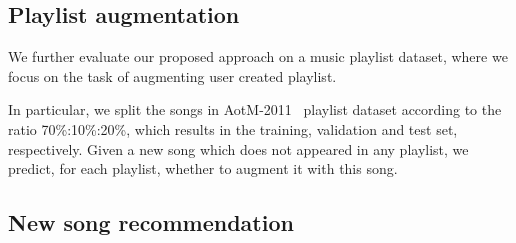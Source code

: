 \subsection{Playlist augmentation}

We further evaluate our proposed approach on a music playlist dataset, 
where we focus on the task of augmenting user created playlist.

In particular, we split the songs in AotM-2011~\cite{mcfee2012hypergraph} playlist dataset
according to the ratio 70\%:10\%:20\%, which results in the training, validation and test set, respectively.
Given a new song which does not appeared in any playlist, 
we predict, for each playlist, whether to augment it with this song.


\subsection{New song recommendation}
